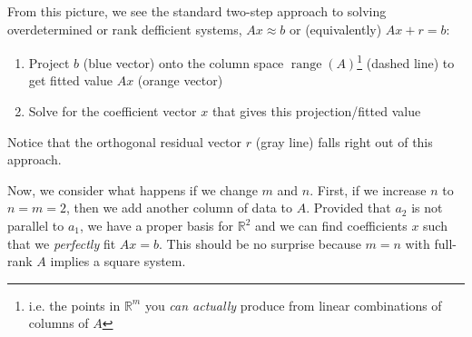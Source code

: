 \documentclass[12pt]{article}
\numberwithin{equation}{section} %
\theoremstyle{plain}
\theoremstyle{definition}
\theoremstyle{remark}
\newcommand{\R}{\mathbb{R}}
\newcommand{\Rm}{\mathbb{R}^m}
\newcommand{\range}{\operatorname{range}}
\begin{document}
\begin{figure}[htbp!]
\centering
{}
\end{figure}

From this picture, we see the standard two-step approach
to solving overdetermined or rank defficient systems,
$Ax\approx b$ or (equivalently) $Ax+r=b$:
\begin{enumerate}[label=(\roman*)]
  \item Project $b$ (blue vector) onto the column space
    $\range(A)$\footnote{%
        i.e. the points in $\Rm$ you \emph{can actually} produce from
        linear combinations of columns of $A$
    }
    (dashed line) to get fitted value $Ax$ (orange vector)
  \item Solve for the coefficient vector $x$ that gives this
    projection/fitted value
\end{enumerate}
Notice that the orthogonal residual vector $r$ (gray line) falls right
out of this approach.

\clearpage
Now, we consider what happens if we change $m$ and $n$. First, if we
increase $n$ to $n=m=2$, then we add another column of data to $A$.
Provided that $a_2$ is not parallel to $a_1$, we have a proper basis for
$\R^2$ and we can find coefficients $x$ such that we \emph{perfectly}
fit $Ax=b$. This should be no surprise because $m=n$ with full-rank $A$
implies a square system.
\end{document}
